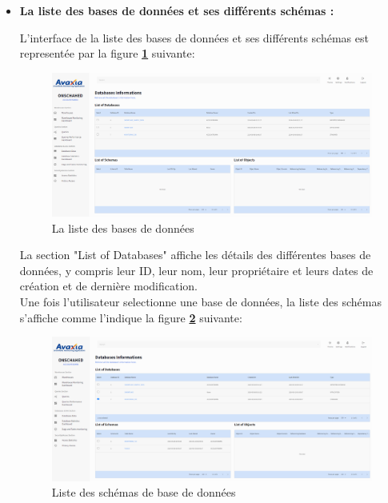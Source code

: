 \begin{itemize}
        \item \textbf{La liste des bases de données et ses différents schémas :}
        \par L'interface de la liste des bases de données et ses différents schémas est representée par la figure \textbf{\ref{fig:dblist}} suivante:
        \begin{figure}[H]
            \centering
            \includegraphics[width =1\linewidth]{img/captures/database/1.png}
            \caption{La liste des bases de données}
                \label{fig:dblist}
            \end{figure}
            \par La section "List of Databases" affiche les détails des différentes bases de données, y compris leur ID, leur nom, leur propriétaire et leurs dates de création et de dernière modification.\\ 
            Une fois l'utilisateur selectionne une base de données, la liste des schémas s'affiche comme l'indique la figure \textbf{\ref{fig:schemas}} suivante:
                \begin{figure}[H]
                \centering
                \includegraphics[width =1\linewidth]{img/captures/database/2.png}
                \caption{Liste des schémas de base de données}
                    \label{fig:schemas}
                \end{figure}


\end{itemize}
